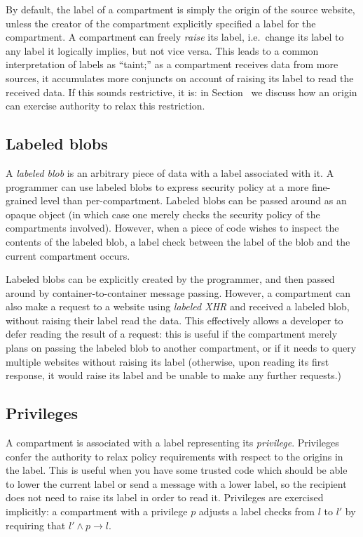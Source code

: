 By default, the label of a compartment is simply the origin of the
source website, unless the creator of the compartment explicitly
specified a label for the compartment.
%
A compartment can freely \emph{raise} its label, i.e.\ change its label
to any label it logically implies, but not vice versa.
%
This leads to a common interpretation of labels as ``taint;'' as
a compartment receives data from more sources, it accumulates more
conjuncts on account of raising its label to read the received data.
%
If this sounds restrictive, it is: in Section~ we discuss how
an origin can exercise authority to relax this restriction.

\subsection{Labeled blobs}

A \emph{labeled blob} is an arbitrary piece of data with a label
associated with it.
%
A programmer can use labeled blobs to express security policy at
a more fine-grained level than per-compartment.
%
Labeled blobs can be passed around as an opaque object (in which case one merely
checks the security policy of the compartments involved).
%
However, when a piece of code wishes to inspect the contents of the
labeled blob, a label check between the label of the blob and the
current compartment occurs.

Labeled blobs can be explicitly created by the programmer, and then
passed around by container-to-container message passing.
%
However, a compartment can also make a request to a website using
\emph{labeled XHR} and received a labeled blob, without raising their
label read the data.
%
This effectively allows a developer to defer reading the result of
a request: this is useful if the compartment merely plans on passing
the labeled blob to another compartment, or if it needs to query
multiple websites without raising its label (otherwise, upon reading
its first response, it would raise its label and be unable to
make any further requests.)


\subsection{Privileges}

A compartment is associated with a label representing its \emph{privilege}.
%
Privileges confer the authority to relax policy requirements
with respect to the origins in the label.
%
This is useful when you have some trusted code which should be
able to lower the current label or send a message with a lower label, so
the recipient does not need to raise its label in order to read it.
%
Privileges are exercised implicitly: a compartment with a privilege $p$
adjusts a label checks from $l$ to $l'$ by requiring that $l' \land p
\rightarrow l$.

